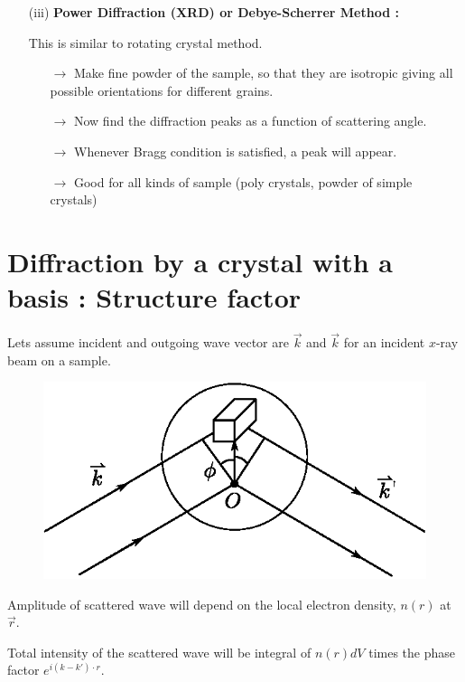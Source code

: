 \begin{itemize}
\item[(iii)] {\bf Power Diffraction (XRD) or Debye-Scherrer Method :}

This is similar to rotating crystal method.
\begin{itemize}
\item[$\to$] Make fine powder of the sample, so that they are isotropic giving all possible orientations for different grains.

\item[$\to$] Now find the diffraction peaks as a function of scattering angle.

\item[$\to$] Whenever Bragg condition is satisfied, a peak will appear.

\item[$\to$] Good for all kinds of sample (poly crystals, powder of simple crystals)
\end{itemize}
\end{itemize}

\section*{Diffraction by a crystal with a basis : Structure factor}

Lets assume incident and outgoing wave vector are $\overrightarrow{k}$ and $\overrightarrow{k}$ for an incident $x$-ray beam on a sample.
\begin{figure}[H]
\centering
\includegraphics{images/lecture14/fig9.eps}
\end{figure}

Amplitude of scattered wave will depend on the local electron density, $n(r)$ at $\overrightarrow{r}$.

Total intensity of the scattered wave will be integral of $n(r)dV$ times the phase factor $e^{i(k-k')\cdot r}$.

